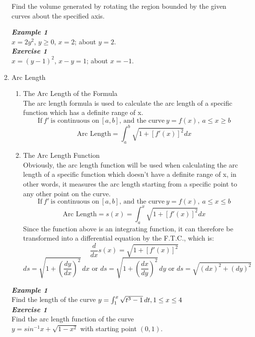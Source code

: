 \documentclass[12px]{article}
\begin{document}
\begin{enumerate}
    Find the volume generated by rotating the region bounded by the given curves about the specified axis.
    \begin{multicols}{2}
        \textit{\textbf{Example 1}}\\
        $x=2y^2$, $y\geq0$, $x=2$; about $y=2$.\\
        \textit{\textbf{Exercise 1}}\\
        $x=(y-1)^2$, $x-y=1$; about $x=-1$.
    \end{multicols}
\newpage
\item Arc Length
\begin{enumerate}[(1)]
    \item The Arc Length of the Formula\\
    \hspace*{2em}The arc length formula is used to calculate the arc length of a specific function which has a definite range of x.
    $$\text{If}\ f'\ \text{is continuous on}\ [a,b]\text{, and the curve}\ y=f(x),\ a\leq x\geq b$$
    $$\text{Arc Length} = \int_a^b \sqrt{1+[f'(x)]^2}dx$$
    \item The Arc Length Function\\
    \hspace*{2em}Obviously, the arc length function will be used when calculating the arc length of a specific function which doesn’t have a definite range of x, in other words, it measures the arc length starting from a specific point to any other point on the curve.
    $$\text{If}\ f'\ \text{is continuous on}\ [a,b]\text{, and the curve}\ y=f(x),\ a\leq x\leq b$$
    $$\text{Arc Length}=s(x)=\int_a^x\sqrt{1+[f'(x)]^2}dx$$
    \hspace*{2em}Since the function above is an integrating function, it can therefore be transformed into a differential equation by the F.T.C., which is:
    $$\frac{d}{dx}s(x)=\sqrt{1+[f'(x)]^2}$$
    $$ds=\sqrt{1+(\frac{dy}{dx})^2}\,dx\text{ or }ds=\sqrt{1+(\frac{dx}{dy})^2}\,dy\text{ or }ds=\sqrt{(dx)^2+(dy)^2}$$
\end{enumerate}
    \begin{multicols}{2}
        \textit{\textbf{Example 1}}\\
        Find the length of the curve $y=\int_1^x\sqrt{t^3-1}\,dt,\\ 1\leq x\leq 4$\\
        \textit{\textbf{Exercise 1}}\\
        Find the arc length function of the curve \\
        $y=sin^{-1}x+\sqrt{1-x^2}$ with starting point $(0,1)$.

\end{multicols}
\end{enumerate}
\end{document}

